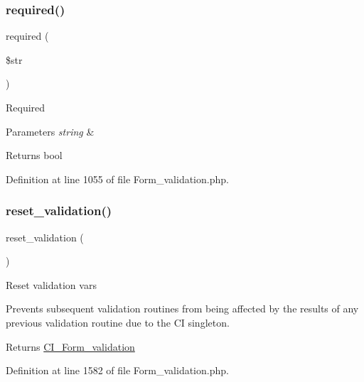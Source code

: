 \subsubsection{\texorpdfstring{required()}{required()}}
{\footnotesize\ttfamily required (\begin{DoxyParamCaption}\item[{}]{\$str }\end{DoxyParamCaption})}

Required


\begin{DoxyParams}{Parameters}
{\em string} & \\
\hline
\end{DoxyParams}
\begin{DoxyReturn}{Returns}
bool 
\end{DoxyReturn}


Definition at line 1055 of file Form\+\_\+validation.\+php.

\mbox{\label{class_c_i___form__validation_a84b8bd64032f6be532968015cba11361}} 
\subsubsection{\texorpdfstring{reset\_validation()}{reset\_validation()}}
{\footnotesize\ttfamily reset\+\_\+validation (\begin{DoxyParamCaption}{ }\end{DoxyParamCaption})}

Reset validation vars

Prevents subsequent validation routines from being affected by the results of any previous validation routine due to the CI singleton.

\begin{DoxyReturn}{Returns}
\mbox{\hyperlink{class_c_i___form__validation}{C\+I\+\_\+\+Form\+\_\+validation}} 
\end{DoxyReturn}


Definition at line 1582 of file Form\+\_\+validation.\+php.

\mbox{\label{class_c_i___form__validation_a304567453dbe1809dc0dc3ad99918383}} 
